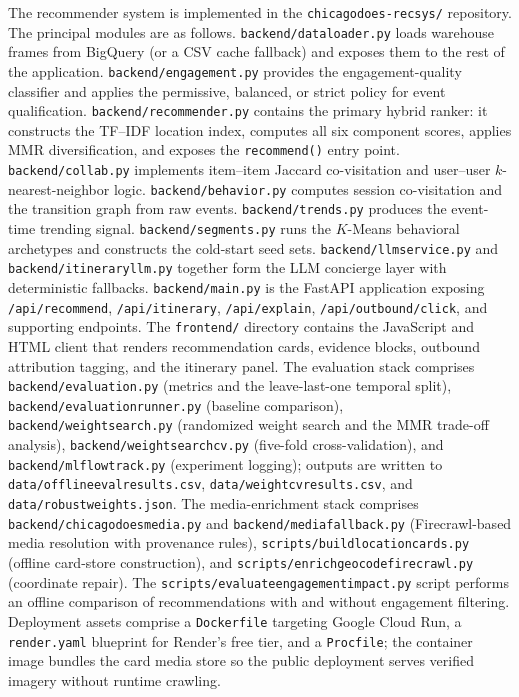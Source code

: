 \documentclass[12pt,letterpaper]{article}
\newcommand{\codeunderscore}{\discretionary{\textunderscore}{}{\textunderscore}}
\newcommand{\code}[1]{\begingroup\let\_\codeunderscore\texttt{\small #1}\endgroup}
\begin{document}
The recommender system is implemented in the
\code{chicagodoes-recsys/} repository. The principal modules are as
follows. \code{backend/data\_loader.py} loads warehouse frames from
BigQuery (or a CSV cache fallback) and exposes them to the rest of
the application. \code{backend/engagement.py} provides the
engagement-quality classifier and applies the permissive, balanced,
or strict policy for event qualification. \code{backend/recommender.py}
contains the primary hybrid ranker: it constructs the TF--IDF
location index, computes all six component scores, applies MMR
diversification, and exposes the \code{recommend()} entry point.
\code{backend/collab.py} implements item--item Jaccard co-visitation
and user--user $k$-nearest-neighbor logic.
\code{backend/behavior.py} computes session co-visitation and the
transition graph from raw events. \code{backend/trends.py} produces
the event-time trending signal. \code{backend/segments.py} runs the
$K$-Means behavioral archetypes and constructs the cold-start seed
sets. \code{backend/llm\_service.py} and
\code{backend/itinerary\_llm.py} together form the LLM concierge
layer with deterministic fallbacks. \code{backend/main.py} is the
FastAPI application exposing \code{/api/recommend},
\code{/api/itinerary}, \code{/api/explain},
\code{/api/outbound/click}, and supporting endpoints.
The \code{frontend/} directory contains the JavaScript and HTML
client that renders recommendation cards, evidence blocks, outbound
attribution tagging, and the itinerary panel. The evaluation stack
comprises \code{backend/evaluation.py} (metrics and the
leave-last-one temporal split), \code{backend/evaluation\_runner.py}
(baseline comparison), \code{backend/weight\_search.py} (randomized
weight search and the MMR trade-off analysis),
\code{backend/weight\_search\_cv.py} (five-fold cross-validation),
and \code{backend/mlflow\_track.py} (experiment logging); outputs are
written to \code{data/offline\_eval\_results.csv},
\code{data/weight\_cv\_results.csv}, and
\code{data/robust\_weights.json}. The media-enrichment stack
comprises \code{backend/chicagodoes\_media.py} and
\code{backend/media\_fallback.py} (Firecrawl-based media resolution
with provenance rules), \code{scripts/build\_location\_cards.py}
(offline card-store construction), and
\code{scripts/enrich\_geocode\_firecrawl.py} (coordinate repair). The
\code{scripts/evaluate\_engagement\_impact.py} script performs an
offline comparison of recommendations with and without engagement
filtering. Deployment assets comprise a \code{Dockerfile} targeting
Google Cloud Run, a \code{render.yaml} blueprint for Render's free
tier, and a \code{Procfile}; the container image bundles the card
media store so the public deployment serves verified imagery without
runtime crawling.
\end{document}
